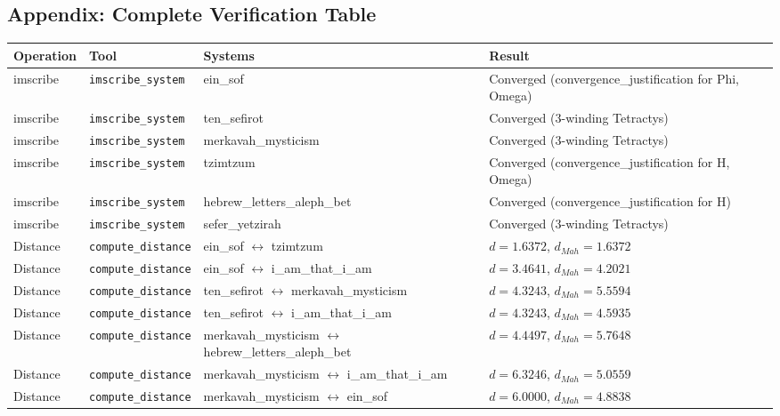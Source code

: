 \documentclass[12pt,a4paper]{article}
\begin{document}
\subsection{Appendix: Complete Verification Table}

\begin{table}[htbp]
\centering
\small
{}
\begin{tabularx}{\textwidth}{>{\centering\arraybackslash}X >{\centering\arraybackslash}X >{\centering\arraybackslash}X >{\centering\arraybackslash}X}
\toprule
\rowcolor{gray!25}\textbf{Operation} & \textbf{Tool} & \textbf{Systems} & \textbf{Result} \\
\midrule
\rowcolors{1}{white}{gray!10}
imscribe & \texttt{imscribe\_system} & ein\_sof & Converged (convergence\_justification for Phi, Omega) \\
imscribe & \texttt{imscribe\_system} & ten\_sefirot & Converged (3-winding Tetractys) \\
imscribe & \texttt{imscribe\_system} & merkavah\_mysticism & Converged (3-winding Tetractys) \\
imscribe & \texttt{imscribe\_system} & tzimtzum & Converged (convergence\_justification for H, Omega) \\
imscribe & \texttt{imscribe\_system} & hebrew\_letters\_aleph\_bet & Converged (convergence\_justification for H) \\
imscribe & \texttt{imscribe\_system} & sefer\_yetzirah & Converged (3-winding Tetractys) \\
Distance & \texttt{compute\_distance} & ein\_sof $\leftrightarrow$ tzimtzum & $d = 1.6372$, $d_{Mah} = 1.6372$ \\
Distance & \texttt{compute\_distance} & ein\_sof $\leftrightarrow$ i\_am\_that\_i\_am & $d = 3.4641$, $d_{Mah} = 4.2021$ \\
Distance & \texttt{compute\_distance} & ten\_sefirot $\leftrightarrow$ merkavah\_mysticism & $d = 4.3243$, $d_{Mah} = 5.5594$ \\
Distance & \texttt{compute\_distance} & ten\_sefirot $\leftrightarrow$ i\_am\_that\_i\_am & $d = 4.3243$, $d_{Mah} = 4.5935$ \\
Distance & \texttt{compute\_distance} & merkavah\_mysticism $\leftrightarrow$ hebrew\_letters\_aleph\_bet & $d = 4.4497$, $d_{Mah} = 5.7648$ \\
Distance & \texttt{compute\_distance} & merkavah\_mysticism $\leftrightarrow$ i\_am\_that\_i\_am & $d = 6.3246$, $d_{Mah} = 5.0559$ \\
Distance & \texttt{compute\_distance} & merkavah\_mysticism $\leftrightarrow$ ein\_sof & $d = 6.0000$, $d_{Mah} = 4.8838$ \\

\end{tabularx}
\end{table}
\end{document}
